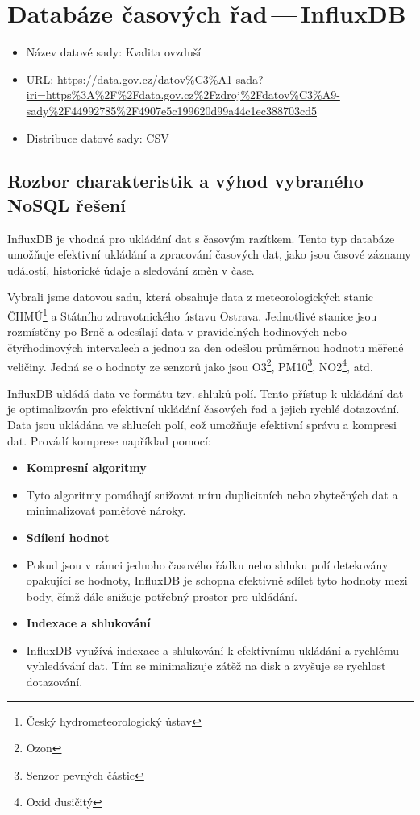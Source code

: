 \documentclass[a4paper, 11pt]{article}
\begin{document}
    \newpage
    \section{Databáze časových řad\,---\,InfluxDB}

    \begin{itemize}
        \item Název datové sady: Kvalita ovzduší
        \item URL: \url{https://data.gov.cz/datov%C3%A1-sada?iri=https%3A%2F%2Fdata.gov.cz%2Fzdroj%2Fdatov%C3%A9-sady%2F44992785%2F4907e5c199620d99a44c1ec388703cd5}
        \item Distribuce datové sady: CSV
    \end{itemize}

    \subsection{Rozbor charakteristik a výhod vybraného NoSQL řešení}
    InfluxDB je vhodná pro ukládání dat s časovým razítkem. Tento typ databáze umožňuje efektivní ukládání a zpracování časových dat, jako jsou časové záznamy událostí, historické údaje a sledování změn v čase. 
    
    Vybrali jsme datovou sadu, která obsahuje data z meteorologických stanic ČHMÚ\footnote{Český hydrometeorologický ústav} a Státního zdravotnického ústavu Ostrava. Jednotlivé stanice jsou rozmístěny po Brně a odesílají data v pravidelných hodinových nebo čtyřhodinových intervalech a jednou za den odešlou průměrnou hodnotu měřené veličiny. Jedná se o hodnoty ze senzorů jako jsou O3\footnote{Ozon}, PM10\footnote{Senzor pevných částic}, NO2\footnote{Oxid dusičitý}, atd.

    InfluxDB ukládá data ve formátu tzv. shluků polí. Tento přístup k ukládání dat je optimalizován pro efektivní ukládání časových řad a jejich rychlé dotazování. Data jsou ukládána ve shlucích polí, což umožňuje efektivní správu a kompresi dat. Provádí komprese například pomocí: 
    \begin{itemize}
        \item{\textbf{Kompresní algoritmy}}
        \item[]
        Tyto algoritmy pomáhají snižovat míru duplicitních nebo zbytečných dat a minimalizovat paměťové nároky.
        \item{\textbf{Sdílení hodnot}}
        \item[]
        Pokud jsou v rámci jednoho časového řádku nebo shluku polí detekovány opakující se hodnoty, InfluxDB je schopna efektivně sdílet tyto hodnoty mezi body, čímž dále snižuje potřebný prostor pro ukládání.
        \item{\textbf{Indexace a shlukování}}
        \item[]
         InfluxDB využívá indexace a shlukování k efektivnímu ukládání a rychlému vyhledávání dat. Tím se minimalizuje zátěž na disk a zvyšuje se rychlost dotazování.
    \end{itemize}
\end{document}
